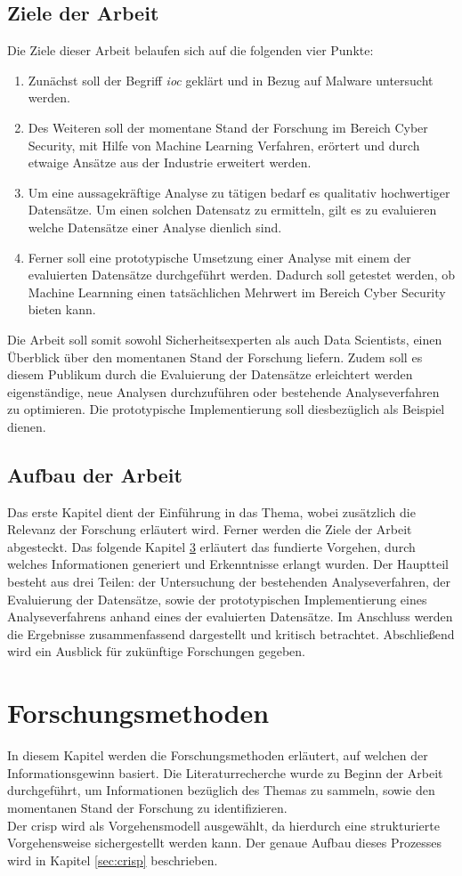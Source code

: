 \documentclass[
    12pt, %
    DIV10,
    ngerman, %
    a4paper, %
    oneside, %
    titlepage, %
    parskip=half, %
    headings=normal, %
    listof=totoc, %
    bibliography=totoc, %
    index=totoc, %
    captions=tableheading, %
    final %
]{scrreprt}
\begin{document}
\section{Ziele der Arbeit}
Die Ziele dieser Arbeit belaufen sich auf die folgenden vier Punkte:
\begin{enumerate}
\item Zunächst soll der Begriff \emph{\acl{ioc}} geklärt und in Bezug auf Malware untersucht werden. 
\item Des Weiteren soll der momentane Stand der Forschung im Bereich Cyber Security, mit Hilfe von Machine Learning Verfahren, erörtert und durch etwaige Ansätze aus der Industrie erweitert werden.
\item Um eine aussagekräftige Analyse zu tätigen bedarf es qualitativ hochwertiger Datensätze. Um einen solchen Datensatz zu ermitteln, gilt es zu evaluieren welche Datensätze einer Analyse dienlich sind.
\item Ferner soll eine prototypische Umsetzung einer Analyse mit einem der evaluierten Datensätze durchgeführt werden. Dadurch soll getestet werden, ob Machine Learnning einen tatsächlichen Mehrwert im Bereich Cyber Security bieten kann.
\end{enumerate}
Die Arbeit soll somit sowohl Sicherheitsexperten als auch Data Scientists, einen Überblick über den momentanen Stand der Forschung liefern. Zudem soll es diesem Publikum durch die Evaluierung der Datensätze erleichtert werden eigenständige, neue Analysen durchzuführen oder bestehende Analyseverfahren zu optimieren. Die prototypische Implementierung soll diesbezüglich als Beispiel dienen.
\section{Aufbau der Arbeit}
Das erste Kapitel dient der Einführung in das Thema, wobei zusätzlich die Relevanz der Forschung erläutert wird. Ferner werden die Ziele der Arbeit abgesteckt. Das folgende Kapitel \ref{sec:forschung} erläutert das fundierte Vorgehen, durch welches Informationen generiert und Erkenntnisse erlangt wurden. Der Hauptteil besteht aus drei Teilen: der Untersuchung der bestehenden Analyseverfahren, der Evaluierung der Datensätze, sowie der prototypischen Implementierung eines Analyseverfahrens anhand eines der evaluierten Datensätze. Im Anschluss werden die Ergebnisse zusammenfassend dargestellt und kritisch betrachtet. Abschlie{\ss}end wird ein Ausblick für zukünftige Forschungen gegeben.
\chapter{Forschungsmethoden}\label{sec:forschung}
In diesem Kapitel werden die Forschungsmethoden erläutert, auf welchen der Informationsgewinn basiert. Die Literaturrecherche wurde zu Beginn der Arbeit durchgeführt, um Informationen bezüglich des Themas zu sammeln, sowie den momentanen Stand der Forschung zu identifizieren.\\
Der \ac{crisp} wird als Vorgehensmodell ausgewählt, da hierdurch eine strukturierte Vorgehensweise sichergestellt werden kann. Der genaue Aufbau dieses Prozesses wird in Kapitel \ref{sec:crisp} beschrieben.
\end{document}
